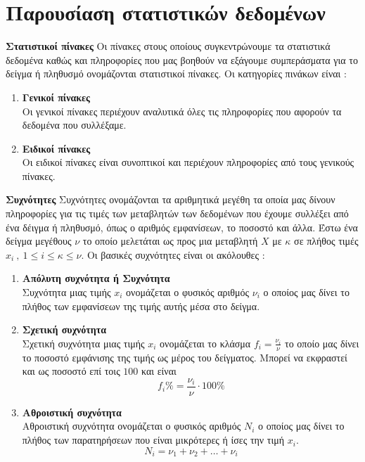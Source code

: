 \documentclass[twoside,nofonts,internet,math,spyros]{frontisthrio}
\begin{document}
\section{Παρουσίαση στατιστικών δεδομένων}
\orismoi
\begin{arithmisi}
\item\textbf{Στατιστικοί πίνακες}
Οι πίνακες στους οποίους συγκεντρώνουμε τα στατιστικά δεδομένα καθώς και πληροφορίες που μας βοηθούν να εξάγουμε συμπεράσματα για το δείγμα ή πληθυσμό ονομάζονται στατιστικοί πίνακες. Οι κατηγορίες πινάκων είναι :
\begin{enumerate}[label=\bf\arabic*.,itemsep=0mm]
\item \textbf{Γενικοί πίνακες}\\
Οι γενικοί πίνακες περιέχουν αναλυτικά όλες τις πληροφορίες που αφορούν τα δεδομένα που συλλέξαμε.
\item \textbf{Ειδικοί πίνακες}\\
Οι ειδικοί πίνακες είναι συνοπτικοί και περιέχουν πληροφορίες από τους γενικούς πίνακες.
\end{enumerate}
\item\textbf{Συχνότητες}
Συχνότητες ονομάζονται τα αριθμητικά μεγέθη τα οποία μας δίνουν πληροφορίες για τις τιμές των μεταβλητών των δεδομένων που έχουμε συλλέξει από ένα δέιγμα ή πληθυσμό, όπως ο αριθμός εμφανίσεων, το ποσοστό και άλλα. Έστω ένα δείγμα μεγέθους $ \nu $ το οποίο μελετάται ως προς μια μεταβλητή $ X $ με $ \kappa $ σε πλήθος τιμές $ x_i\ ,\ 1\leq i\leq \kappa\leq\nu $. Οι βασικές συχνότητες είναι οι ακόλουθες :
\begin{enumerate}[label=\bf\arabic*.,itemsep=0mm]
\item \textbf{Απόλυτη συχνότητα ή Συχνότητα}\\
Συχνότητα μιας τιμής $ x_i $ ονομάζεται ο φυσικός αριθμός $ \nu_i $ ο οποίος μας δίνει το πλήθος των εμφανίσεων της τιμής αυτής μέσα στο δείγμα.
\item \textbf{Σχετική συχνότητα}\\
Σχετική συχνότητα μιας τιμής $ x_i $ ονομάζεται το κλάσμα $ f_i=\frac{\nu_i}{\nu} $ το οποίο μας δίνει το ποσοστό εμφάνισης της τιμής ως μέρος του δείγματος. Μπορεί να εκφραστεί και ως ποσοστό επί τοις $ 100 $ και είναι \[ f_i\%=\frac{\nu_i}{\nu}\cdot 100\% \]
\item \textbf{Αθροιστική συχνότητα}\\
Αθροιστική συχνότητα ονομάζεται ο φυσικός αριθμός $ N_i $ ο οποίος μας δίνει το πλήθος των παρατηρήσεων που είναι μικρότερες ή ίσες την τιμή $ x_i $.
\[ N_i=\nu_1+\nu_2+\ldots+\nu_i \]

\end{enumerate}
\end{arithmisi}
\end{document}

